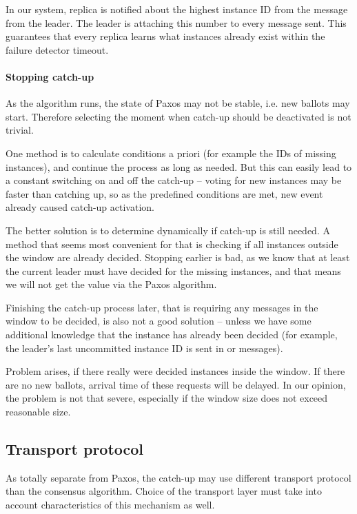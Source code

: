 In our system, replica is notified about the highest instance ID from the \alive message from the leader. The leader is attaching this number to every \alive message sent. This guarantees that every replica learns what instances already exist within the failure detector timeout.

\paragraph*{Stopping catch-up} As the algorithm runs, the state of Paxos may not be stable, i.e. new ballots may start. Therefore selecting the moment when catch-up should be deactivated is not trivial.

One method is to calculate conditions a priori (for example the IDs of missing instances), and continue the process as long as needed. But this can easily lead to a constant switching on and off the catch-up -- voting for new instances may be faster than catching up, so as the predefined conditions are met, new event already caused catch-up activation.

The better solution is to determine dynamically if catch-up is still needed. A method that seems most convenient for that is checking if all instances outside the window are already decided. Stopping earlier is bad, as we know that at least the current leader must have decided for the missing instances, and that means we will not get the value via the Paxos algorithm.

Finishing the catch-up process later, that is requiring any messages in the window to be decided, is also not a good solution -- unless we have some additional knowledge that the instance has already been decided (for example, the leader's last uncommitted instance ID is sent in \propose or \alive messages).

Problem arises, if there really were decided instances inside the window. If there are no new ballots, arrival time of these requests will be delayed. In our opinion, the problem is not that severe, especially if the window size does not exceed reasonable size.

\subsection{Transport protocol}
\label{subsec:transport_protocole}
As totally separate from Paxos, the catch-up may use different transport protocol than the consensus algorithm.
Choice of the transport layer must take into account characteristics of this mechanism as well.

